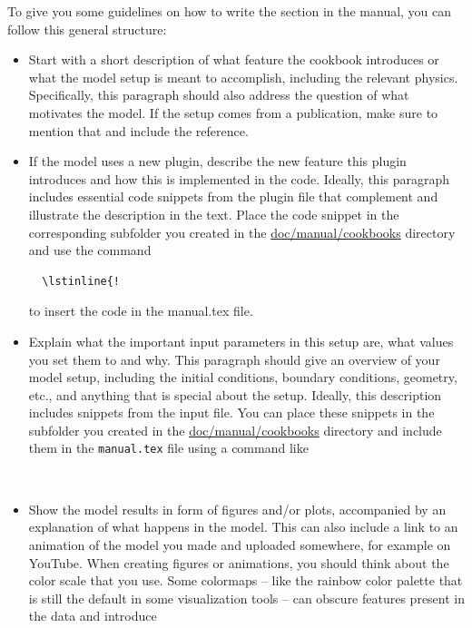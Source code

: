 \documentclass{article}
\begin{document}
To give you some guidelines on how to write the section in the manual, you can follow this general structure:
\begin{itemize}
\item Start with a short description of what feature the cookbook introduces or what
  the model setup is meant to accomplish, including the relevant physics.
  Specifically, this paragraph should also address the question of what motivates the model.
  If the setup comes from a publication, make sure to mention that and include the reference.
\item If the model uses a new plugin, describe the new feature this plugin introduces
  and how this is implemented in the code. Ideally, this paragraph includes essential code
  snippets from the plugin file that complement and illustrate the description in the text.
  Place the code snippet in the corresponding subfolder you created in the
  \href{doc/manual/cookbooks/.}{doc/manual/cookbooks} directory and
  use the command
  \begin{verbatim}
  \lstinline{!
  \end{verbatim}
  to insert the code in the manual.tex file.
\item Explain what the important input parameters in this setup are, what values you
  set them to and why. This paragraph should give an overview of your model setup,
  including the initial conditions, boundary conditions, geometry, etc., and anything that
  is special about the setup. Ideally, this description includes snippets from
  the input file. You can place these snippets in the subfolder you created in the
  \href{doc/manual/cookbooks/.}{doc/manual/cookbooks}
  directory and include them in the \texttt{manual.tex} file using a command like
  \begin{verbatim}
  
  \end{verbatim}
\item Show the model results in form of figures and/or plots, accompanied by an explanation
  of what happens in the model. This can also include a link to an animation of the model
  you made and uploaded somewhere, for example on YouTube.
  When creating figures or animations, you should think about the color scale that you use.
  Some colormaps -- like the rainbow color palette that is still the default in some
  visualization tools -- can obscure features present in the data and introduce

\end{itemize}
\end{document}
